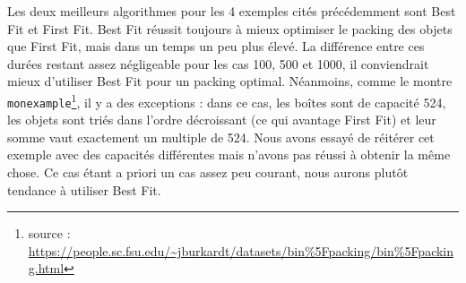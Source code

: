 \documentclass{article}
\begin{document}
Les deux meilleurs algorithmes pour les 4 exemples cités précédemment sont Best Fit et First Fit.
Best Fit réussit toujours à mieux optimiser le packing des objets que First Fit, mais dans un temps un peu plus élevé.
La différence entre ces durées restant assez négligeable pour les cas 100, 500 et 1000, il conviendrait mieux d'utiliser Best Fit pour un packing optimal.
Néanmoins, comme le montre \texttt{monexample}\footnote{source : \url{https://people.sc.fsu.edu/~jburkardt/datasets/bin\%5Fpacking/bin\%5Fpacking.html}}, il y a des exceptions : dans ce cas, les boîtes sont de capacité 524,
les objets sont triés dans l'ordre décroissant (ce qui avantage First Fit) et leur somme vaut exactement un multiple de 524.
Nous avons essayé de réitérer cet exemple avec des capacités différentes mais n'avons pas réussi à obtenir la même chose.
Ce cas étant a priori un cas assez peu courant, nous aurons plutôt tendance à utiliser Best Fit.
\end{document}
